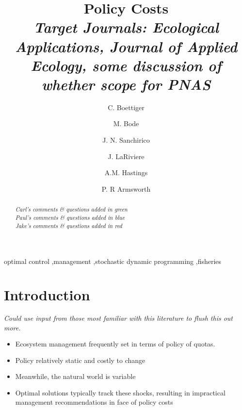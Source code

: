 \documentclass[authoryear, review, 12pt]{elsarticle}
\newcommand{\cdb}[1]{{\it \color{darkgreen} #1}}
\newcommand{\pa}[1]{{\it \color{darkblue} #1}}
\newcommand{\jr}[1]{{\it \color{darkred} #1}}
\begin{document}
\begin{frontmatter}
\title{Policy Costs \\ \pa{
Target Journals: Ecological Applications, Journal of Applied Ecology, some discussion of whether scope for PNAS}}
\author[cpb]{C. Boettiger}
\author[melbourne]{M. Bode}
\author[esp]{J. N. Sanchirico}
\author[utk-econ]{J. LaRiviere}
\author[cpb,esp]{A.M. Hastings}
\author[utk-eeb]{P. R Armsworth}
\address[cpb]{Center for Population Biology, University of California, Davis, California 95616, USA}
\address[melbourne]{Australian Research Council Centre of Excellence for Environmental Decisions, University of Melbourne, School of Botany,
Parkville, Melbourne, VIC 3010, Australia}
\address[esp]{Department of Environmental Science \& Policy, University of California, Davis, CA 95616, USA}
\address[utk-econ]{Department of Economics, University of Tennessee, Knoxville, TN 37996, USA}
\address[utk-eeb]{Department of Ecology and Evolutionary Biology, University of Tennessee, Knoxville, TN 37996, USA}


\begin{abstract}
\cdb{Carl's comments \& questions added in green} \\
\pa{Paul's comments \& questions added in blue} \\
\jr{Jake's comments \& questions added in red}
\end{abstract}
\begin{keyword}
  optimal control \sep management \sep stochastic dynamic programming \sep fisheries 
\end{keyword}

\end{frontmatter}

\section{Introduction}


\emph{Could use input from those most familiar with this literature to flush this out more.}

\begin{itemize}
  \item Ecosystem management frequently set in terms of policy of quotas. 
  \item Policy relatively static and costly to change
  \item Meanwhile, the natural world is variable
  \item Optimal solutions typically track these shocks, resulting in impractical management recommendations in face of policy costs
\end{itemize}
\end{document}

